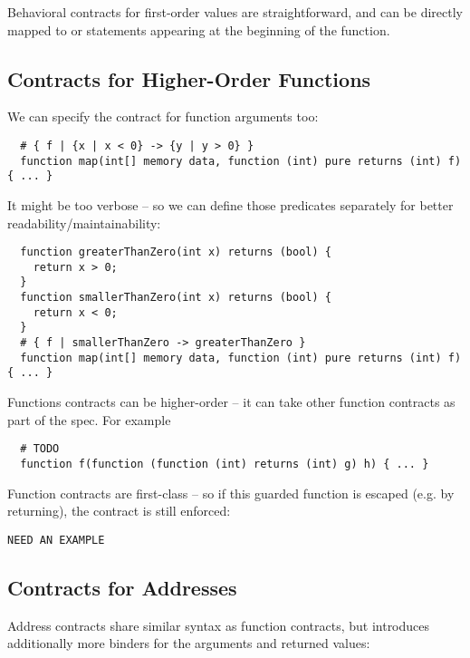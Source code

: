 \documentclass[acmsmall,review,anonymous]{acmart}\settopmatter{printfolios=true,printccs=false,printacmref=false}
\begin{document}
Behavioral contracts for first-order values are straightforward,
and can be directly mapped to  or  statements
appearing at the beginning of the function.

\subsection{Contracts for Higher-Order Functions}

\iffalse
\begin{lstlisting}
function map(uint[] memory data, function (uint) pure returns (uint) f)
  internal pure returns (uint[] memory r)
{
  r = new uint[](data.length);
  for (uint i = 0; i < data.length; i++) {
    r[i] = f(data[i]);
  }
}
\end{lstlisting}
\fi

We can specify the contract for function arguments too:
\begin{lstlisting}
  # { f | {x | x < 0} -> {y | y > 0} }
  function map(int[] memory data, function (int) pure returns (int) f) { ... }
\end{lstlisting}
It might be too verbose -- so we can define those predicates separately for better readability/maintainability:
\begin{lstlisting}
  function greaterThanZero(int x) returns (bool) {
    return x > 0;
  }
  function smallerThanZero(int x) returns (bool) {
    return x < 0;
  }
  # { f | smallerThanZero -> greaterThanZero }
  function map(int[] memory data, function (int) pure returns (int) f) { ... }
\end{lstlisting}

Functions contracts can be higher-order -- it can take other function contracts
as part of the spec. For example
\begin{lstlisting}
  # TODO
  function f(function (function (int) returns (int) g) h) { ... }
\end{lstlisting}

Function contracts are first-class -- so if this guarded function is escaped
(e.g. by returning), the contract is still enforced:
\begin{lstlisting}
NEED AN EXAMPLE
\end{lstlisting}


\subsection{Contracts for Addresses}

Address contracts share similar syntax as function contracts, but introduces
additionally more binders for the arguments and returned values:
\end{document}
